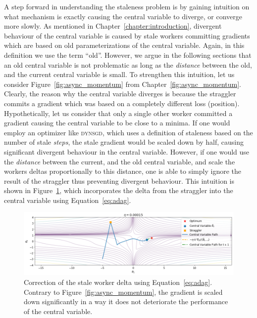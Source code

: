 A step forward in understanding the staleness problem is by gaining intuition on what mechanism is exactly causing the central variable to diverge, or converge more slowly. As mentioned in Chapter~\ref{chapter:introduction}, divergent behaviour of the central variable is caused by stale workers committing gradients which are based on old parameterizations of the central variable. Again, in this definition we use the term ``old''. However, we argue in the following sections that an old central variable is not problematic as long as the \emph{distance} between the old, and the current central variable is small. To strengthen this intuition, let us consider Figure~\ref{fig:async_momentum} from Chapter~\ref{fig:async_momentum}. Clearly, the reason why the central variable diverges is because the straggler commits a gradient which was based on a completely different loss (position). Hypothetically, let us consider that only a single other worker committed a gradient causing the central variable to be close to a minima. If one would employ an optimizer like \textsc{dynsgd}, which uses a definition of staleness based on the number of stale \emph{steps}, the stale gradient would be scaled down by half, causing significant divergent behaviour in the central variable. However, if one would use the \emph{distance} between the current, and the old central variable, and scale the workers deltas proportionally to this distance, one is able to simply ignore the result of the straggler thus preventing divergent behaviour. This intuition is shown in Figure~\ref{fig:adag_straggler_corrected}, which incorporates the delta from the straggler into the central variable using Equation~\ref{eq:adag}.\\

\begin{figure}[H]
  \centering
  \includegraphics[width=\textwidth]{resources/images/async_straggler_corrected_adag}
  \caption{Correction of the stale worker delta using Equation~\ref{eq:adag}. Contrary to Figure~\ref{fig:async_momentum}, the gradient is scaled down significantly in a way it does not deteriorate the performance of the central variable.}
  \label{fig:adag_straggler_corrected}
\end{figure}

